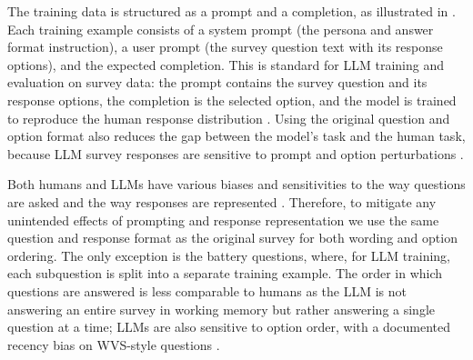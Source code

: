 The training data is structured as a prompt and a completion, as illustrated in . Each training example consists of a system prompt (the persona and answer format instruction), a user prompt (the survey question text with its response options), and the expected completion. This is standard for LLM training and evaluation on survey data: the prompt contains the survey question and its response options, the completion is the selected option, and the model is trained to reproduce the human response distribution \cite{durmusMeasuringRepresentationSubjective2024,nieSurveytoBehaviorDownstreamAlignment2025,santurkarWhoseOpinionsLanguage2023,aroraProbingPreTrainedLanguage2025}. Using the original question and option format also reduces the gap between the model's task and the human task, because LLM survey responses are sensitive to prompt and option perturbations \cite{rupprechtPromptPerturbationsReveal2025}.



Both humans and LLMs have various biases and sensitivities to the way questions are asked and the way responses are represented \cite{rupprechtPromptPerturbationsReveal2025,rottgerPoliticalCompassSpinning2024,luFantasticallyOrderedPrompts2022, schumanQuestionsAnswersAttitude1996, tourangeauCognitiveProcessesUnderlying1988}. Therefore, to mitigate any unintended effects of prompting and response representation we use the same question and response format as the original survey for both wording and option ordering. The only exception is the battery questions, where, for LLM training, each subquestion is split into a separate training example. The order in which questions are answered is less comparable to humans as the LLM is not answering an entire survey in working memory but rather answering a single question at a time; LLMs are also sensitive to option order, with a documented recency bias on WVS-style questions \cite{rupprechtPromptPerturbationsReveal2025}.


